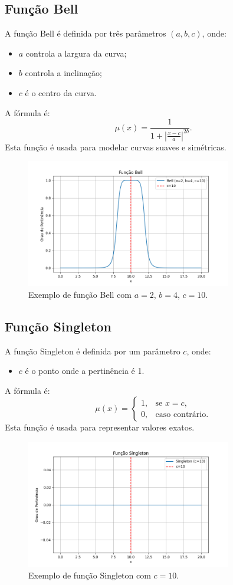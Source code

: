 \documentclass[a4paper,12pt]{article}
\begin{document}
\subsection{Função Bell}
A função Bell é definida por três parâmetros $(a, b, c)$, onde:
\begin{itemize}
    \item $a$ controla a largura da curva;
    \item $b$ controla a inclinação;
    \item $c$ é o centro da curva.
\end{itemize}
A fórmula é:
\[
\mu(x) = \frac{1}{1 + \left|\frac{x - c}{a}\right|^{2b}}.
\]
Esta função é usada para modelar curvas suaves e simétricas.
\begin{figure}[H]
    \centering
    \includegraphics[width=0.8\textwidth]{img/bell.png}
    \caption{Exemplo de função Bell com $a=2$, $b=4$, $c=10$.}
\end{figure}

\subsection{Função Singleton}
A função Singleton é definida por um parâmetro $c$, onde:
\begin{itemize}
    \item $c$ é o ponto onde a pertinência é 1.
\end{itemize}
A fórmula é:
\[
\mu(x) =
\begin{cases}
1, & \text{se } x = c, \\
0, & \text{caso contrário.}
\end{cases}
\]
Esta função é usada para representar valores exatos.
\begin{figure}[H]
    \centering
    \includegraphics[width=0.8\textwidth]{img/singleton.png}
    \caption{Exemplo de função Singleton com $c=10$.}
\end{figure}
\end{document}

